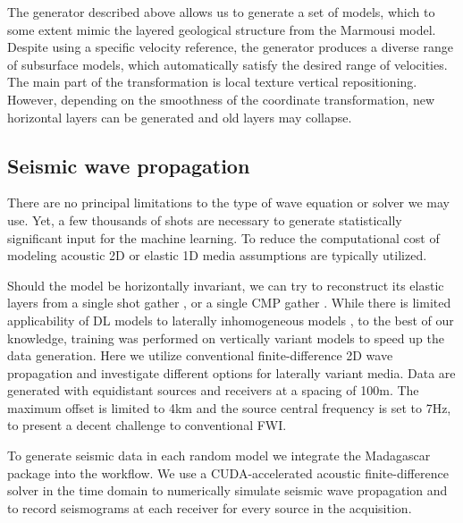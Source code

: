 \documentclass[paper,twocolomn]{geophysics}
\begin{document}


The generator described above allows us to generate a set of models, which to some extent mimic the layered geological structure from the Marmousi model. Despite using a specific velocity reference, the generator produces a diverse range of subsurface models, which automatically satisfy the desired range of velocities. The main part of the transformation is local texture vertical repositioning. However, depending on the smoothness of the coordinate transformation, new horizontal layers can be generated and old layers may collapse.

\subsection{Seismic wave propagation}
There are no principal limitations to the type of wave equation or solver we may use. Yet, a few thousands of shots are necessary to generate statistically significant input for the machine learning. To reduce the computational cost of modeling acoustic 2D \citep{polo2018,ovcharenko2018,ovcharenko2019deep, li2019} or elastic 1D \citep[e.g.][]{zheng2019} media assumptions are typically utilized.

Should the model be horizontally invariant, we can try to reconstruct its elastic layers from a single shot gather \citep{roth1994}, or a single CMP gather \citep{zheng2019}.
While there is limited applicability of DL models to laterally inhomogeneous models \citep{zheng2019}, to the best of our knowledge, training was performed on vertically variant models to speed up the data generation. Here we utilize conventional finite-difference 2D wave propagation and investigate different options for laterally variant media.
Data are generated with equidistant sources and receivers at a spacing of 100m. The maximum offset is limited to 4km and the source central frequency is set to 7Hz, to present a decent challenge to conventional FWI.

To generate seismic data in each random model we integrate the Madagascar package \citep{fomel2013madagascar} into the workflow. 
We use a CUDA-accelerated acoustic finite-difference solver in the time domain to numerically simulate seismic wave propagation and to record seismograms at each receiver for every source in the acquisition.
%
\end{document}
